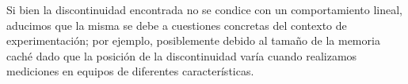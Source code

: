 Si bien la discontinuidad encontrada no se condice con un comportamiento lineal, aducimos que la misma se debe a cuestiones concretas del contexto de experimentación; por ejemplo, posiblemente debido al tamaño de la memoria caché dado que la posición de la discontinuidad varía cuando realizamos mediciones en equipos de diferentes características.


